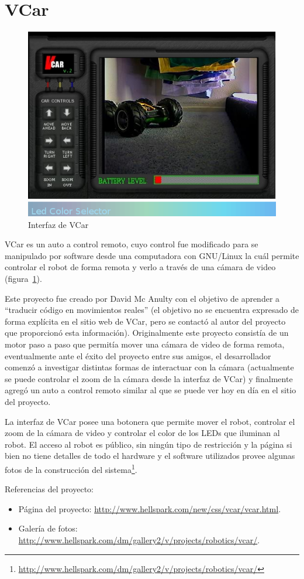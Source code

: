 \section{VCar}

\begin{figure}
    \centering
    \includegraphics[width=0.5\linewidth]{figures/vcar}
    \caption{Interfaz de VCar}
    \label{fig:vcar}
\end{figure}

VCar es un auto a control remoto, cuyo control fue modificado para
se manipulado por software desde  una computadora con GNU/Linux la
cuál permite controlar el robot de forma remota y verlo
a través de una cámara de
video
(figura~\ref{fig:vcar}).

Este proyecto fue creado por David Mc Anulty con el objetivo de
aprender a ``traducir código en movimientos reales''
(el objetivo no se encuentra
expresado de forma explícita en el sitio web  de VCar, pero se contactó
al autor del proyecto que proporcionó esta información).
Originalmente
este proyecto consistía de un motor paso a paso que permitía mover
una cámara de video de forma remota, eventualmente ante el éxito
del proyecto entre sus amigos, el desarrollador comenzó a investigar
distintas formas de interactuar con la cámara (actualmente se puede
controlar el zoom de la cámara desde la interfaz de VCar) y
finalmente agregó un auto a control remoto similar al que se puede
ver hoy en día en el sitio del proyecto.

La interfaz de VCar posee una botonera que permite mover el robot,
controlar el zoom de la cámara de video y controlar el color
de los LEDs que iluminan al robot.
El acceso al robot es público,
sin ningún tipo de restricción y la página
si bien no tiene detalles de todo el hardware y el software utilizados
provee algunas fotos de la construcción del
sistema\footnote{\url{http://www.hellspark.com/dm/gallery2/v/projects/robotics/vcar/}}.

Referencias del proyecto:
\begin{itemize}
    \item Página del proyecto: \url{http://www.hellspark.com/new/css/vcar/vcar.html}.
    \item Galería de fotos: \url{http://www.hellspark.com/dm/gallery2/v/projects/robotics/vcar/}.
\end{itemize}


